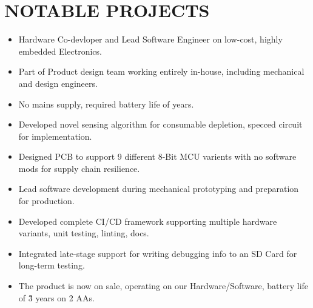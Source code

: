 

\section{NOTABLE PROJECTS}
\vspace{-4mm}

{
  {\begin{itemize}
    \item Hardware Co-devloper and Lead Software Engineer on low-cost, highly embedded Electronics.
    \item Part of Product design team working entirely in-house, including mechanical and design engineers.
    \item No mains supply, required battery life of years. 
    \item Developed novel sensing algorithm for consumable depletion, specced circuit for implementation. 
    \item Designed PCB to support 9 different 8-Bit MCU varients with no software mods for supply chain resilience.
    \item Lead software development during mechanical prototyping and preparation for production. 
    \item Developed complete CI/CD framework supporting multiple hardware variants, unit testing, linting, docs. 
    \item Integrated late-stage support for writing debugging info to an SD Card for long-term testing.
    \item The product is now on sale, operating on our Hardware/Software, battery life of \~{3} years on 2 AAs. 
  \end{itemize} 
  }
}

